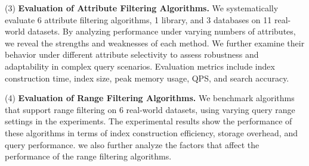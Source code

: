 \documentclass[sigconf, nonacm]{acmart}
\begin{document}
	(3)\textbf{ Evaluation of Attribute Filtering Algorithms.}
	We systematically evaluate 6 attribute filtering algorithms, 1 library, and 3 databases on 11 real-world datasets. By analyzing performance under varying numbers of attributes, we reveal the strengths and weaknesses of each method. We further examine their behavior under different attribute selectivity to assess robustness and adaptability in complex query scenarios. Evaluation metrics include index construction time, index size, peak memory usage, QPS, and search accuracy.
%	

	(4)\textbf{ Evaluation of Range Filtering Algorithms.}
	We benchmark algorithms that support range filtering on 6 real-world datasets, using varying query range settings in the experiments. The experimental results show the performance of these algorithms in terms of index construction efficiency, storage overhead, and query performance. we also further analyze the factors that affect the performance of the range filtering algorithms.
	
\end{document}
